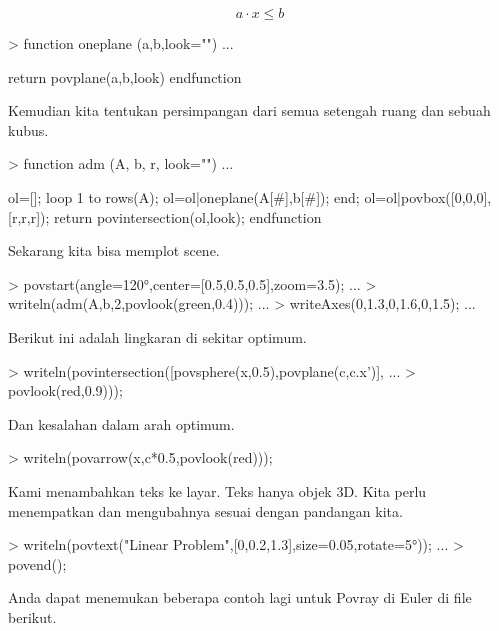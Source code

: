 \documentclass{report}
\begin{document}
\begin{eulernotebook}
\begin{eulercomment}
\begin{eulercomment}
\begin{eulercomment}
\end{eulercomment}
\begin{eulerformula}
\[
a \cdot x \le b
\]
\end{eulerformula}
\begin{eulerprompt}
> function oneplane (a,b,look="") ...
\end{eulerprompt}
\begin{eulerudf}
    return povplane(a,b,look)
  endfunction
\end{eulerudf}
\begin{eulercomment}
Kemudian kita tentukan persimpangan dari semua setengah ruang dan
sebuah kubus.
\end{eulercomment}
\begin{eulerprompt}
> function adm (A, b, r, look="") ...
\end{eulerprompt}
\begin{eulerudf}
    ol=[];
    loop 1 to rows(A); ol=ol|oneplane(A[#],b[#]); end;
    ol=ol|povbox([0,0,0],[r,r,r]);
    return povintersection(ol,look);
  endfunction
\end{eulerudf}
\begin{eulercomment}
Sekarang kita bisa memplot scene.
\end{eulercomment}
\begin{eulerprompt}
> povstart(angle=120°,center=[0.5,0.5,0.5],zoom=3.5); ...
> writeln(adm(A,b,2,povlook(green,0.4))); ...
> writeAxes(0,1.3,0,1.6,0,1.5); ...
\end{eulerprompt}
\begin{eulercomment}
Berikut ini adalah lingkaran di sekitar optimum.
\end{eulercomment}
\begin{eulerprompt}
> writeln(povintersection([povsphere(x,0.5),povplane(c,c.x')], ...
>   povlook(red,0.9)));
\end{eulerprompt}
\begin{eulercomment}
Dan kesalahan dalam arah optimum.
\end{eulercomment}
\begin{eulerprompt}
> writeln(povarrow(x,c*0.5,povlook(red)));
\end{eulerprompt}
\begin{eulercomment}
Kami menambahkan teks ke layar. Teks hanya objek 3D. Kita perlu
menempatkan dan mengubahnya sesuai dengan pandangan kita.
\end{eulercomment}
\begin{eulerprompt}
> writeln(povtext("Linear Problem",[0,0.2,1.3],size=0.05,rotate=5°)); ...
> povend();
\end{eulerprompt}
\begin{eulercomment}
Anda dapat menemukan beberapa contoh lagi untuk Povray di Euler di
file berikut.


\end{eulercomment}
\end{eulercomment}
\end{eulercomment}
\end{eulernotebook}
\end{document}
